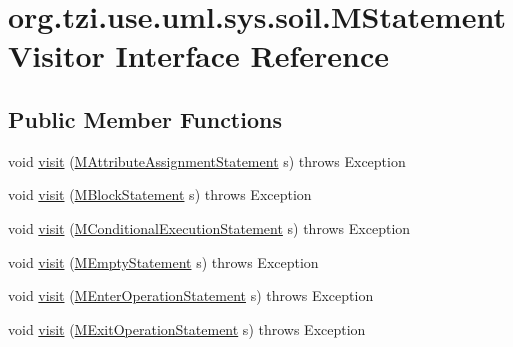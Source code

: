 \hypertarget{interfaceorg_1_1tzi_1_1use_1_1uml_1_1sys_1_1soil_1_1_m_statement_visitor}{\section{org.\-tzi.\-use.\-uml.\-sys.\-soil.\-M\-Statement\-Visitor Interface Reference}
\label{interfaceorg_1_1tzi_1_1use_1_1uml_1_1sys_1_1soil_1_1_m_statement_visitor}
}
\subsection*{Public Member Functions}
\begin{DoxyCompactItemize}
\item 
void \hyperlink{interfaceorg_1_1tzi_1_1use_1_1uml_1_1sys_1_1soil_1_1_m_statement_visitor_a2daeebcee55fab2425884c11da7f3c64}{visit} (\hyperlink{classorg_1_1tzi_1_1use_1_1uml_1_1sys_1_1soil_1_1_m_attribute_assignment_statement}{M\-Attribute\-Assignment\-Statement} s)  throws Exception
\item 
void \hyperlink{interfaceorg_1_1tzi_1_1use_1_1uml_1_1sys_1_1soil_1_1_m_statement_visitor_aec3404f0a2e652c828ccb466386fe9e3}{visit} (\hyperlink{classorg_1_1tzi_1_1use_1_1uml_1_1sys_1_1soil_1_1_m_block_statement}{M\-Block\-Statement} s)  throws Exception
\item 
void \hyperlink{interfaceorg_1_1tzi_1_1use_1_1uml_1_1sys_1_1soil_1_1_m_statement_visitor_a64c18837c1969a34b8de6eabaaeb1d46}{visit} (\hyperlink{classorg_1_1tzi_1_1use_1_1uml_1_1sys_1_1soil_1_1_m_conditional_execution_statement}{M\-Conditional\-Execution\-Statement} s)  throws Exception
\item 
void \hyperlink{interfaceorg_1_1tzi_1_1use_1_1uml_1_1sys_1_1soil_1_1_m_statement_visitor_ac042ae4239d8502998bc874b3df56a3d}{visit} (\hyperlink{classorg_1_1tzi_1_1use_1_1uml_1_1sys_1_1soil_1_1_m_empty_statement}{M\-Empty\-Statement} s)  throws Exception
\item 
void \hyperlink{interfaceorg_1_1tzi_1_1use_1_1uml_1_1sys_1_1soil_1_1_m_statement_visitor_a34c311a8f197b2a1d0ced3c42146bade}{visit} (\hyperlink{classorg_1_1tzi_1_1use_1_1uml_1_1sys_1_1soil_1_1_m_enter_operation_statement}{M\-Enter\-Operation\-Statement} s)  throws Exception
\item 
void \hyperlink{interfaceorg_1_1tzi_1_1use_1_1uml_1_1sys_1_1soil_1_1_m_statement_visitor_ae14fd554d72f5ade46eb6c3189aa6bc3}{visit} (\hyperlink{classorg_1_1tzi_1_1use_1_1uml_1_1sys_1_1soil_1_1_m_exit_operation_statement}{M\-Exit\-Operation\-Statement} s)  throws Exception

\end{DoxyCompactItemize}

